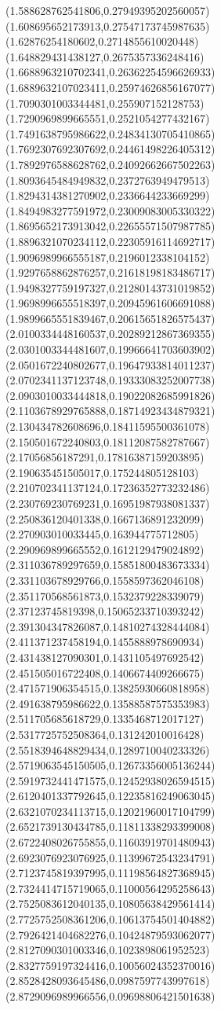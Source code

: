 {(1.588628762541806,0.27949395202560057)
(1.608695652173913,0.27547173745987635)
(1.62876254180602,0.2714855610020448)
(1.648829431438127,0.2675357336248416)
(1.6688963210702341,0.26362254596626933)
(1.6889632107023411,0.25974626856167077)
(1.7090301003344481,0.255907152128753)
(1.7290969899665551,0.2521054277432167)
(1.7491638795986622,0.24834130705410865)
(1.7692307692307692,0.24461498226405312)
(1.7892976588628762,0.24092662667502263)
(1.8093645484949832,0.2372763949479513)
(1.8294314381270902,0.2336644233669299)
(1.8494983277591972,0.23009083005330322)
(1.8695652173913042,0.22655571507987785)
(1.8896321070234112,0.22305916114692717)
(1.9096989966555187,0.2196012338104152)
(1.9297658862876257,0.21618198183486717)
(1.9498327759197327,0.21280143731019852)
(1.9698996655518397,0.20945961606691088)
(1.9899665551839467,0.20615651826575437)
(2.0100334448160537,0.20289212867369355)
(2.0301003344481607,0.19966641703603902)
(2.0501672240802677,0.19647933814011237)
(2.0702341137123748,0.19333083252007738)
(2.0903010033444818,0.19022082685991826)
(2.1103678929765888,0.18714923434879321)
(2.130434782608696,0.18411595500361078)
(2.150501672240803,0.18112087582787667)
(2.17056856187291,0.17816387159203895)
(2.190635451505017,0.175244805128103)
(2.210702341137124,0.17236352773232486)
(2.230769230769231,0.16951987938081337)
(2.250836120401338,0.1667136891232099)
(2.270903010033445,0.163944775712805)
(2.290969899665552,0.1612129479024892)
(2.311036789297659,0.15851800483673334)
(2.331103678929766,0.1558597362046108)
(2.351170568561873,0.1532379228339079)
(2.37123745819398,0.15065233710393242)
(2.391304347826087,0.14810274328444084)
(2.411371237458194,0.1455888978690934)
(2.431438127090301,0.1431105497692542)
(2.451505016722408,0.1406674409266675)
(2.471571906354515,0.13825930660818958)
(2.491638795986622,0.13588587575353983)
(2.511705685618729,0.1335468712017127)
(2.5317725752508364,0.131242010016428)
(2.5518394648829434,0.1289710040233326)
(2.5719063545150505,0.12673356005136244)
(2.5919732441471575,0.12452938026594515)
(2.6120401337792645,0.12235816249063045)
(2.6321070234113715,0.12021960017104799)
(2.6521739130434785,0.11811338293399008)
(2.6722408026755855,0.11603919701480943)
(2.6923076923076925,0.11399672543234791)
(2.7123745819397995,0.11198564827368945)
(2.7324414715719065,0.11000564295258643)
(2.7525083612040135,0.10805638429561414)
(2.7725752508361206,0.10613754501404882)
(2.7926421404682276,0.10424879593062077)
(2.8127090301003346,0.1023898061952523)
(2.8327759197324416,0.10056024352370016)
(2.8528428093645486,0.0987597743997618)
(2.8729096989966556,0.09698806421501638)
}
